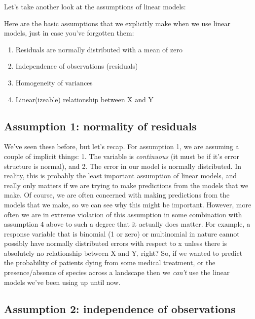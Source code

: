 \documentclass[
]{book}
\begin{document}
Let's take another look at the assumptions of linear models:

Here are the basic assumptions that we explicitly make when we use linear models, just in case you've forgotten them:

\begin{enumerate}
\def\labelenumi{\arabic{enumi}.}
\item
  Residuals are normally distributed with a mean of zero
\item
  Independence of observations (residuals)
\item
  Homogeneity of variances
\item
  Linear(izeable) relationship between X and Y
\end{enumerate}

\hypertarget{assumption-1-normality-of-residuals}{%
\subsection{Assumption 1: normality of residuals}\label{assumption-1-normality-of-residuals}}

We've seen these before, but let's recap. For assumption 1, we are assuming a couple of implicit things: 1. The variable is \emph{continuous} (it must be if it's error structure is normal), and 2. The error in our model is normally distributed. In reality, this is probably the least important assumption of linear models, and really only matters if we are trying to make predictions from the models that we make. Of course, we are often concerned with making predictions from the models that we make, so we can see why this might be important. However, more often we are in extreme violation of this assumption in some combination with assumption 4 above to such a degree that it actually does matter. For example, a response variable that is binomial (1 or zero) or multinomial in nature cannot possibly have normally distributed errors with respect to x unless there is absolutely no relationship between X and Y, right? So, if we wanted to predict the probability of patients dying from some medical treatment, or the presence/absence of species across a landscape then we \emph{can't} use the linear models we've been using up until now.

\hypertarget{assumption-2-independence-of-observations}{%
\subsection{Assumption 2: independence of observations}\label{assumption-2-independence-of-observations}}
\end{document}
